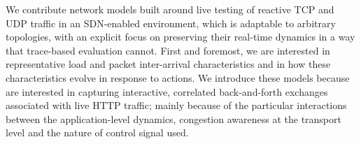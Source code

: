 \documentclass[10pt, times, comsoc]{IEEEtran}
\begin{document}
We contribute network models built around live testing of reactive TCP and UDP traffic in an SDN-enabled environment, which is adaptable to arbitrary topologies, with an explicit focus on preserving their real-time dynamics in a way that trace-based evaluation cannot.
First and foremost, we are interested in representative load and packet inter-arrival characteristics and in how these characteristics evolve in response to actions.
We introduce these models because are interested in capturing interactive, correlated back-and-forth exchanges associated with live HTTP traffic; mainly because of the particular interactions between the application-level dynamics, congestion awareness at the transport level and the nature of control signal used.



\end{document}
